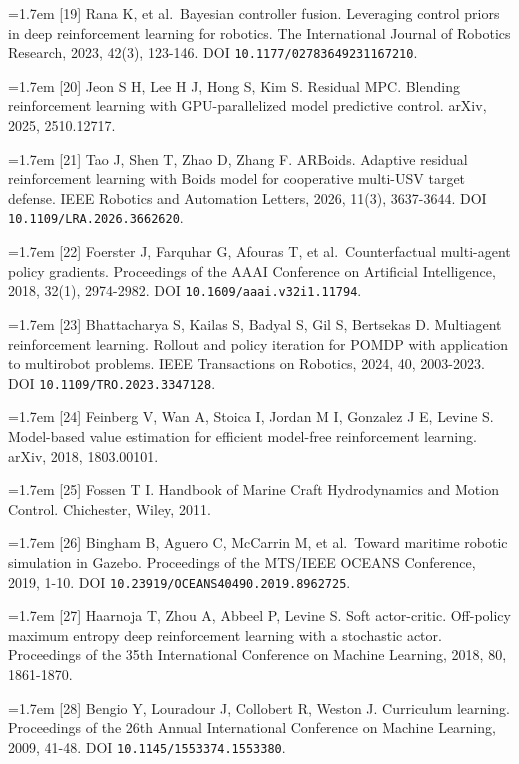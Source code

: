 \documentclass[UTF8,10.5pt,a4paper,fontset=none]{ctexart}
\begin{document}
\noindent\hangindent=1.7em [19] Rana K, et al.~Bayesian controller fusion. Leveraging control
priors in deep reinforcement learning for robotics. The International
Journal of Robotics Research, 2023, 42(3), 123-146. DOI \nolinkurl{10.1177/02783649231167210}.

\noindent\hangindent=1.7em [20] Jeon S H, Lee H J, Hong S, Kim S. Residual MPC. Blending
reinforcement learning with GPU-parallelized model predictive control.
arXiv, 2025, 2510.12717.

\noindent\hangindent=1.7em [21] Tao J, Shen T, Zhao D, Zhang F. ARBoids. Adaptive residual
reinforcement learning with Boids model for cooperative multi-USV target
defense. IEEE Robotics and Automation Letters, 2026, 11(3), 3637-3644.
DOI \nolinkurl{10.1109/LRA.2026.3662620}.

\noindent\hangindent=1.7em [22] Foerster J, Farquhar G, Afouras T, et al.~Counterfactual
multi-agent policy gradients. Proceedings of the AAAI Conference on
Artificial Intelligence, 2018, 32(1), 2974-2982. DOI \nolinkurl{10.1609/aaai.v32i1.11794}.

\noindent\hangindent=1.7em [23] Bhattacharya S, Kailas S, Badyal S, Gil S, Bertsekas D.
Multiagent reinforcement learning. Rollout and policy iteration for
POMDP with application to multirobot problems. IEEE Transactions on
Robotics, 2024, 40, 2003-2023. DOI \nolinkurl{10.1109/TRO.2023.3347128}.

\noindent\hangindent=1.7em [24] Feinberg V, Wan A, Stoica I, Jordan M I, Gonzalez J E, Levine
S. Model-based value estimation for efficient model-free reinforcement
learning. arXiv, 2018, 1803.00101.

\noindent\hangindent=1.7em [25] Fossen T I. Handbook of Marine Craft Hydrodynamics and Motion
Control. Chichester, Wiley, 2011.

\noindent\hangindent=1.7em [26] Bingham B, Aguero C, McCarrin M, et al.~Toward maritime robotic
simulation in Gazebo. Proceedings of the MTS/IEEE OCEANS Conference,
2019, 1-10. DOI \nolinkurl{10.23919/OCEANS40490.2019.8962725}.

\noindent\hangindent=1.7em [27] Haarnoja T, Zhou A, Abbeel P, Levine S. Soft actor-critic.
Off-policy maximum entropy deep reinforcement learning with a stochastic
actor. Proceedings of the 35th International Conference on Machine
Learning, 2018, 80, 1861-1870.

\noindent\hangindent=1.7em [28] Bengio Y, Louradour J, Collobert R, Weston J. Curriculum
learning. Proceedings of the 26th Annual International Conference on
Machine Learning, 2009, 41-48. DOI \nolinkurl{10.1145/1553374.1553380}.
\end{document}
